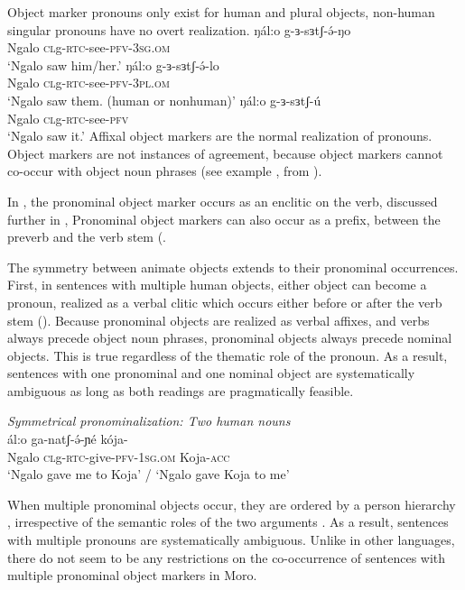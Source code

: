 Object marker pronouns only exist for human and plural objects, non-human singular pronouns have no overt realization.
\ea 
	\ea \gll  ŋál:o g-ɜ-sɜtʃ-ə́-ŋo\\
			  Ngalo \textsc{cl}g-\textsc{rtc}-see-\textsc{pfv}-\textsc{3sg.om}\\
		\glt `Ngalo saw him/her.' \label{ex:ch12:pro1}
	\ex \gll  ŋál:o g-ɜ-sɜtʃ-ə́-lo\\
			  Ngalo \textsc{cl}g-\textsc{rtc}-see-\textsc{pfv}-\textsc{3pl.om}\\
		\glt `Ngalo saw them. (human or nonhuman)'
	\ex \gll  ŋál:o g-ɜ-sɜtʃ-ú\\
			  Ngalo \textsc{cl}g-\textsc{rtc}-see-\textsc{pfv}\\
		\glt `Ngalo saw it.'
\z
\z
Affixal object markers are the normal realization of pronouns. Object markers are not instances of agreement, because object markers cannot co-occur with object noun phrases (see example , from ).

In , the pronominal object marker occurs as an enclitic on the verb, discussed further in , Pronominal object markers can also occur as a prefix, between the preverb and the verb stem (. 

The symmetry between animate objects extends to their pronominal occurrences. First, in sentences with multiple human objects, either object can become a pronoun, realized as a verbal clitic which occurs either before or after the verb stem (). Because pronominal objects are realized as verbal affixes, and verbs always precede object noun phrases, pronominal objects always precede nominal objects. This is true regardless of the thematic role of the pronoun. As a result, sentences with one pronominal and one nominal object are systematically ambiguous as long as both readings are pragmatically feasible.

\ea \textit{Symmetrical pronominalization: Two human nouns}\\
\gll  {}\'al:o ga-natʃ-\'ə-ɲé k\'oja-\textbf{}\\
Ngalo \textsc{cl}g-\textsc{rtc}-give-\textsc{pfv}-\textsc{1sg.om} Koja-\textsc{acc}\\
\glt `Ngalo gave me to Koja' / `Ngalo gave Koja to me' 
\z 

When multiple pronominal objects occur, they are ordered by a person hierarchy \citep{silverstein:1976}, irrespective  of the semantic roles of the two arguments \citep{Ackerman:2015,Jenks:2015}. As a result, sentences with multiple pronouns are systematically ambiguous. Unlike in other languages, there do not seem to be any restrictions on the co-occurrence of sentences with multiple pronominal object markers in Moro.

